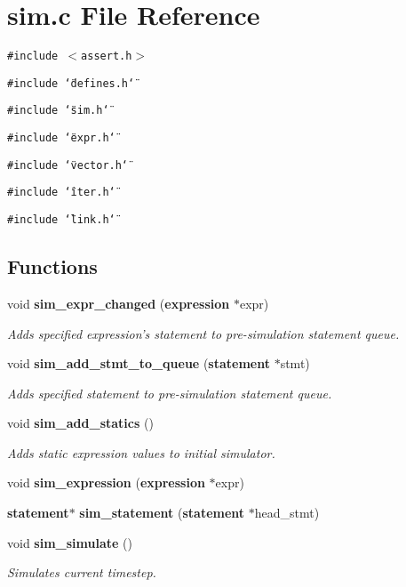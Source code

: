 \section{sim.c File Reference}
\label{sim_8c}
{\tt \#include $<$assert.h$>$}\par
{\tt \#include \char`\"{}defines.h\char`\"{}}\par
{\tt \#include \char`\"{}sim.h\char`\"{}}\par
{\tt \#include \char`\"{}expr.h\char`\"{}}\par
{\tt \#include \char`\"{}vector.h\char`\"{}}\par
{\tt \#include \char`\"{}iter.h\char`\"{}}\par
{\tt \#include \char`\"{}link.h\char`\"{}}\par
\subsection*{Functions}
\begin{CompactItemize}
\item 
void {\bf sim\_\-expr\_\-changed} ({\bf expression} $\ast$expr)
\begin{CompactList}\small\item\em Adds specified expression's statement to pre-simulation statement queue.\item\end{CompactList}\item 
void {\bf sim\_\-add\_\-stmt\_\-to\_\-queue} ({\bf statement} $\ast$stmt)
\begin{CompactList}\small\item\em Adds specified statement to pre-simulation statement queue.\item\end{CompactList}\item 
void {\bf sim\_\-add\_\-statics} ()
\begin{CompactList}\small\item\em Adds static expression values to initial simulator.\item\end{CompactList}\item 
void {\bf sim\_\-expression} ({\bf expression} $\ast$expr)
\item 
{\bf statement}$\ast$ {\bf sim\_\-statement} ({\bf statement} $\ast$head\_\-stmt)
\item 
void {\bf sim\_\-simulate} ()
\begin{CompactList}\small\item\em Simulates current timestep.\item\end{CompactList}\end{CompactItemize}
